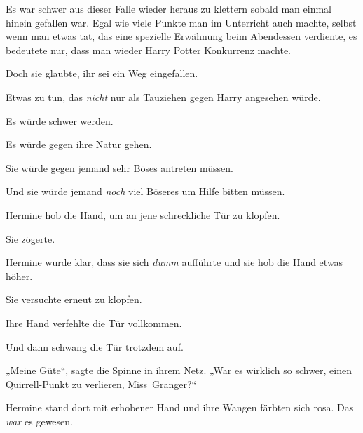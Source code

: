 Es war schwer aus dieser Falle wieder heraus zu klettern sobald man einmal hinein gefallen war. Egal wie viele Punkte man im Unterricht auch machte, selbst wenn man etwas tat, das eine spezielle Erwähnung beim Abendessen verdiente, es bedeutete nur, dass man wieder Harry Potter Konkurrenz machte.

Doch sie glaubte, ihr sei ein Weg eingefallen.

Etwas zu tun, das \emph{nicht} nur als Tauziehen gegen Harry angesehen würde.

Es würde schwer werden.

Es würde gegen ihre Natur gehen.

Sie würde gegen jemand sehr Böses antreten müssen.

Und sie würde jemand \emph{noch} viel Böseres um Hilfe bitten müssen.

Hermine hob die Hand, um an jene schreckliche Tür zu klopfen.

Sie zögerte.

Hermine wurde klar, dass sie sich \emph{dumm} aufführte und sie hob die Hand etwas höher.

Sie versuchte erneut zu klopfen.

Ihre Hand verfehlte die Tür vollkommen.

Und dann schwang die Tür trotzdem auf.

„Meine Güte“, sagte die Spinne in ihrem Netz. „War es wirklich so schwer, einen Quirrell-Punkt zu verlieren, Miss~Granger?“

Hermine stand dort mit erhobener Hand und ihre Wangen färbten sich rosa. Das \emph{war} es gewesen.

